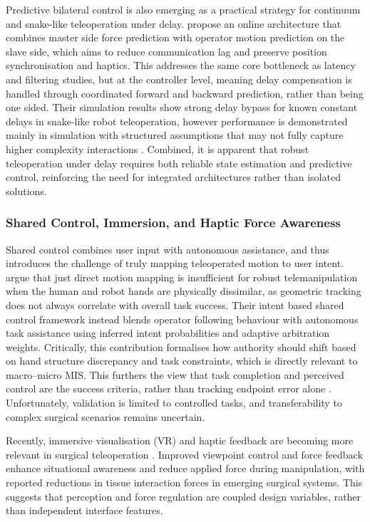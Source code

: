 \documentclass[12pt]{article}
\begin{document}
Predictive bilateral control is also emerging as a practical strategy for
continuum and snake-like teleoperation under delay. \textcite{ebrahimian2024online}
propose an online architecture that combines master side force prediction with operator motion prediction on the slave side,
which aims to reduce communication lag and preserve
position synchronisation and haptics. This addresses the same core bottleneck as
latency and filtering studies, but at the controller level, meaning delay
compensation is handled through coordinated forward and backward prediction,
rather than being one sided. Their simulation results show
strong delay bypass for known constant delays in snake-like robot teleoperation,
however performance is demonstrated mainly in simulation
with structured assumptions that may not fully capture
higher complexity interactions \parencite{ebrahimian2024online}.
Combined, it is apparent that robust teleoperation under delay requires 
both reliable state estimation and predictive control, reinforcing the need for integrated architectures rather than isolated solutions.

\subsubsection{Shared Control, Immersion, and Haptic Force Awareness}
Shared control combines user input with autonomous assistance, and thus introduces the challenge of truly mapping
teleoperated motion to user intent. \textcite{bowman2024intent} argue that just direct motion
mapping is insufficient for robust telemanipulation when the human and
robot hands are physically dissimilar, as geometric tracking does
not always correlate with overall task success. Their intent based
shared control framework instead blends operator following behaviour with
autonomous task assistance using inferred intent probabilities and adaptive
arbitration weights. Critically, this contribution formalises how authority should shift based on hand structure
discrepancy and task constraints, which is directly relevant to macro--micro MIS.
This furthers the view that task completion and perceived control are the success criteria, rather than
tracking endpoint error alone \parencite{bowman2024intent}.
Unfortunately, validation is
limited to controlled tasks, and transferability to complex surgical scenarios
remains uncertain.

Recently, immersive visualisation (VR) and haptic
feedback are becoming more relevant in surgical teleoperation
\parencite{bogue2024developments}.
 Improved viewpoint control and force feedback
enhance situational awareness and reduce applied force during manipulation,
with reported reductions in tissue interaction forces in emerging surgical
systems. This suggests that perception and force regulation are coupled design
variables, rather than independent interface features.
\end{document}
